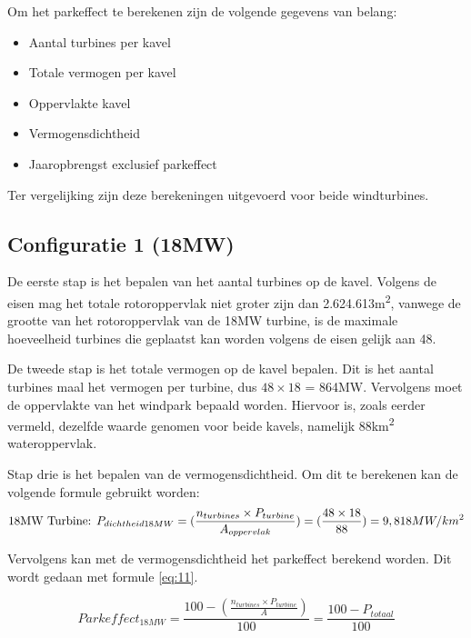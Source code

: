 Om het parkeffect te berekenen zijn de volgende gegevens van belang: 
\begin{itemize}
    \item Aantal turbines per kavel
    \item Totale vermogen per kavel
    \item Oppervlakte kavel
    \item Vermogensdichtheid 
    \item Jaaropbrengst exclusief parkeffect
\end{itemize}

Ter vergelijking zijn deze berekeningen uitgevoerd voor beide windturbines. 

\subsection{Configuratie 1 (18MW)}
De eerste stap is het bepalen van het aantal turbines op de kavel. Volgens de eisen mag het totale rotoroppervlak niet groter zijn dan 2.624.613m\textsuperscript{2}, vanwege de grootte van het rotoroppervlak van de 18MW turbine, is de maximale hoeveelheid turbines die geplaatst kan worden volgens de eisen gelijk aan 48. 

De tweede stap is het totale vermogen op de kavel bepalen. Dit is het aantal turbines maal het vermogen per turbine, dus \(48\times 18\) = 864MW. Vervolgens moet de oppervlakte van het windpark bepaald worden. Hiervoor is, zoals eerder vermeld, dezelfde waarde genomen voor beide kavels, namelijk 88km\textsuperscript{2} wateroppervlak. 

Stap drie is het bepalen van de vermogensdichtheid. Om dit te berekenen kan de volgende formule gebruikt worden: 
\begin{equation} \label{eq:10}
\text{18MW Turbine: } P_{dichtheid18MW}=(\frac{n_{turbines}\times P_{turbine}}{A_{oppervlak}}) = (\frac{48\times 18}{88}) = 9,818 MW/km\textsuperscript{2}
\end{equation}

Vervolgens kan met de vermogensdichtheid het parkeffect berekend worden. Dit wordt gedaan met formule \ref{eq:11}. 

\begin{equation} \label{eq:11}
 Parkeffect_{18MW}=\frac{100-(\frac{n_{turbines}\times P_{turbine}}{A})}{100} = \frac{100-P_{totaal}}{100}
\end{equation}

